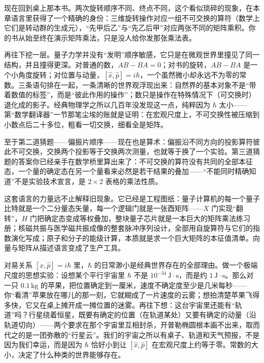 现在回到桌上那本书。两次旋转顺序不同、终点不同，这个看似琐碎的现象，在本章语言里获得了一个精确的身份：三维旋转操作对应一组不可交换的算符（数学上它们是转动群的生成元），“先甲后乙”与“先乙后甲”对应两张不同的矩阵乘积。你的书从始至终在演示矩阵乘法，只是没人给你发那张乘法表。

再往下挖一层。量子力学并没有“发明”顺序敏感，它只是在微观世界里撞见了同一结构，并且撞得更深。对普通的数，$AB-BA=0$；对书的旋转，$AB-BA$ 是一个小角度旋转；对位置与动量，$[\hat{x},\hat{p}]=i\hbar$，一个虽然微小却永远不为零的常数。三条语句排在一起，一条清晰的世界观浮现出来：自然界的基本对象不是“带着数值的标签”，而是“彼此作用的操作”；数只是操作在特殊情况下（可交换时）退化成的影子。经典物理学之所以几百年没发现这一点，纯粹因为 $\hbar$ 太小——第“数学翻译器”一节那笔尘埃的账就是证明：在宏观尺度上，不可交换性被压缩到小数点后二十多位，粗看一切交换，细看全是矩阵。

至于第二道猜题——偏振片顺序——现在也是算术：偏振沿不同方向的投影算符彼此不可交换，交换两个投影等于交换两次测量，也就等于换了一个实验。第三道猜题的答案你已经亲手在数学桥里算出来了：不可交换的算符没有共同的全部本征态，一个量的确定态在另一个量看来必然是若干结果的叠加——“不能同时精确知道”不是实验技术宣言，是 $2\times2$ 表格的乘法性质。

这套语言的力量远不止解释旧现象。它已经是工程图纸：量子计算机的每一个量子比特就是一个二分量态矢量，每一个逻辑门就是一张酉矩阵——$X$ 门实现“翻转”，$H$ 门把确定态变成等权叠加，整块量子芯片就是一本巨大的矩阵乘法练习册；核磁共振与医学磁共振成像的整套脉冲序列设计，全部用自旋算符与它们的指数演化写成；原子和分子的能级计算，本质就是求一个巨大矩阵的本征值清单。向量与矩阵从描述语言变成了生产工具。


\begin{thought}
对易关系 $[\hat{x},\hat{p}]=i\hbar$ 里，$\hbar$ 的日常渺小是经典世界存在的全部理由。做一个极端尺度的思想实验：设想某个平行宇宙里 $\hbar$ 不是 $10^{-34}\,\mathrm{J\cdot s}$，而是约 $1\,\mathrm{J\cdot s}$。那么对一只 $0.1\,\mathrm{kg}$ 的苹果，把位置确定到一厘米，速度不确定度至少是几米每秒——你“看清”苹果放在哪儿的那一刻，它就糊成了一片速度的云雾；想拍清楚苹果飞得多快，它又在桌上摊开成一摊位置的迷雾。再往下想：这台宇宙里还能有“轨道”吗？行星绕着恒星，既要有确定的位置（在轨道某处）又要有确定的动量（沿轨道切向）——两个要求在那个宇宙里互相封杀，开普勒椭圆根本画不出来，取而代之的是一团弥散的“行星云”。我们的宇宙之所以有桌子、轨道和天气预报，不是因为我们幸运，而是因为 $\hbar$ 恰好小到让 $[\hat{x},\hat{p}]$ 在宏观尺度上约等于零。常数的大小，决定了什么种类的世界能够存在。
\end{thought}

